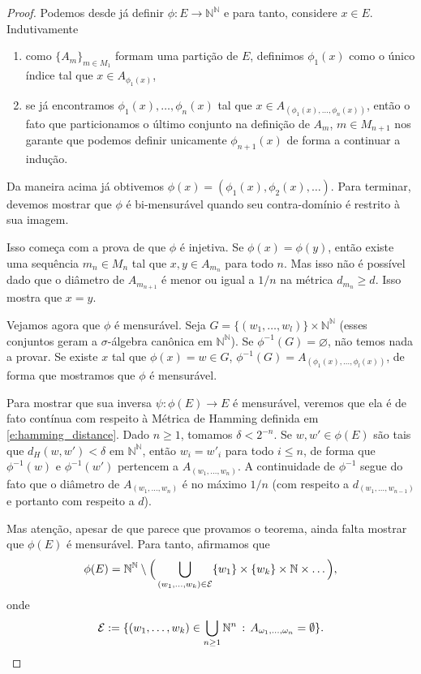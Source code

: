 \begin{topics}
\begin{proof}
  Podemos desde já definir $\phi:E \to \mathbb{N}^\mathbb{N}$ e para tanto, considere $x \in E$.
  Indutivamente
  \begin{enumerate}[\quad a)]
  \item como $\{A_m\}_{m \in M_1}$ formam uma partição de $E$, definimos $\phi_1(x)$ como o único índice tal que $x \in A_{\phi_1(x)}$,
  \item se já encontramos $\phi_1(x), \dots, \phi_n(x)$ tal que $x \in A_{(\phi_1(x), \dots, \phi_n(x))}$, então o fato que particionamos o último conjunto na definição de $A_m$, $m \in M_{n+1}$ nos garante que podemos definir unicamente $\phi_{n+1}(x)$ de forma a continuar a indução.
  \end{enumerate}
  Da maneira acima já obtivemos $\phi(x) = (\phi_1(x), \phi_2(x), \dots)$.
  Para terminar, devemos mostrar que $\phi$ é bi-mensurável quando seu contra-domínio é restrito à sua imagem.

  Isso começa com a prova de que $\phi$ é injetiva.
  Se $\phi(x) = \phi(y)$, então existe uma sequência $m_n \in M_n$ tal que $x, y \in A_{m_n}$ para todo $n$.
  Mas isso não é possível dado que o diâmetro de $A_{m_{n+1}}$ é menor ou igual a $1/n$ na métrica $d_{m_n} \geq d$.
  Isso mostra que $x = y$.

  Vejamos agora que $\phi$ é mensurável.
  Seja $G = \{(w_1, \dots, w_l)\} \times \mathbb{N}^\mathbb{N}$ (esses conjuntos geram a $\sigma$-álgebra canônica em $\mathbb{N}^\mathbb{N}$).
  Se $\phi^{-1}(G) = \varnothing$, não temos nada a provar.
  Se existe $x$ tal que $\phi(x) = w \in G$, $\phi^{-1}(G) = A_{(\phi_1(x), \dots, \phi_l(x))}$, de forma que mostramos que $\phi$ é mensurável.

  Para mostrar que sua inversa $\psi:\phi(E) \to E$ é mensurável, veremos que ela é de fato contínua com respeito à Métrica de Hamming definida em \eqref{e:hamming_distance}.
  Dado $n \geq 1$, tomamos $\delta < 2^{-n}$.
  Se $w, w' \in \phi(E)$ são tais que $d_H(w, w') < \delta$ em $\mathbb{N}^\mathbb{N}$, então $w_i = w'_i$ para todo $i \leq n$, de forma que $\phi^{-1}(w)$ e $\phi^{-1}(w')$ pertencem a $A_{(w_1, \dots, w_n)}$.
  A continuidade de $\phi^{-1}$ segue do fato que o diâmetro de $A_{(w_1, \dots, w_n)}$ é no máximo $1/n$ (com respeito a $d_{(w_1, \dots, w_{n-1})}$ e portanto com respeito a $d$).

  Mas atenção, apesar de que parece que provamos o teorema, ainda falta mostrar que $\phi(E)$ é mensurável.
  Para tanto, afirmamos que
  \begin{equation}
    \label{e:phiE_mensur}
    \phi(E) = \mathbb{N}^\mathbb{N} \setminus \Big( \bigcup_{(w_1, \dots, w_k)\in {\ensuremath{\mathcal E}}} \{w_1\} \times \{w_k\} \times \mathbb{N} \times \dots \Big),
  \end{equation}
  onde
  \begin{equation*}
   {\ensuremath{\mathcal E}}:=\{ (w_1, \dots, w_k)\in \bigcup_{n\ge 1} {\mathbb N}^n \, : \, A_{\omega_1,\dots,\omega_n}=\emptyset \}.
  \end{equation*}


\end{proof}
\end{topics}

